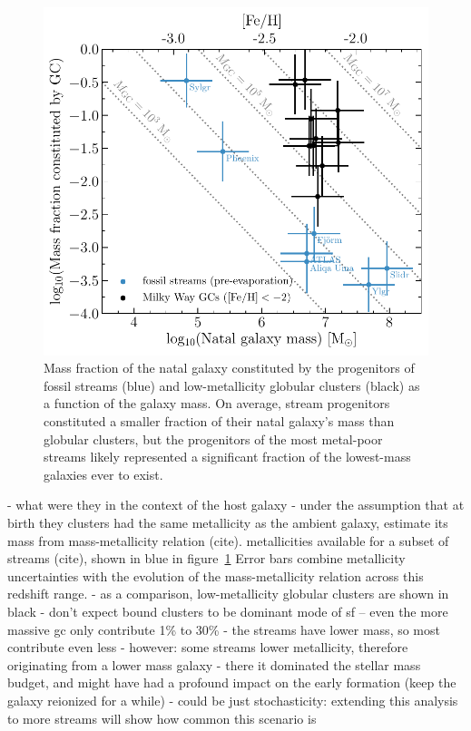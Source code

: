 \documentclass[twocolumn]{aastex63}
\begin{document}
\begin{figure}
\includegraphics[width=\hsize]{figures/mhost_fraction.pdf}
\caption{
\label{fig:mhost}
Mass fraction of the natal galaxy constituted by the progenitors of fossil streams (blue) and low-metallicity globular clusters (black) as a function of the galaxy mass.
On average, stream progenitors constituted a smaller fraction of their natal galaxy's mass than globular clusters, but the progenitors of the most metal-poor streams likely represented a significant fraction of the lowest-mass galaxies ever to exist.
}
\end{figure}

- what were they in the context of the host galaxy
- under the assumption that at birth they clusters had the same metallicity as the ambient galaxy, estimate its mass from mass-metallicity relation (cite).
metallicities available for a subset of streams (cite), shown in blue in figure~\ref{fig:mhost}
Error bars combine metallicity uncertainties with the evolution of the mass-metallicity relation across this redshift range.
- as a comparison, low-metallicity globular clusters are shown in black
- don't expect bound clusters to be dominant mode of sf -- even the more massive gc only contribute 1\% to 30\%
- the streams have lower mass, so most contribute even less
- however: some streams lower metallicity, therefore originating from a lower mass galaxy
- there it dominated the stellar mass budget, and might have had a profound impact on the early formation (keep the galaxy reionized for a while)
- could be just stochasticity: extending this analysis to more streams will show how common this scenario is
\end{document}
